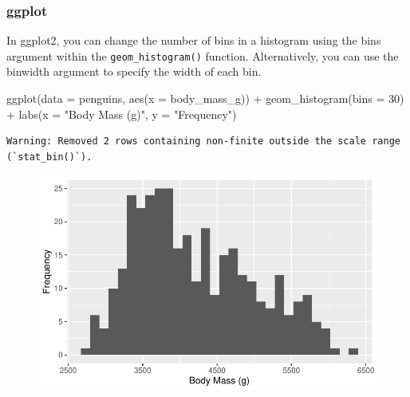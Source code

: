 \documentclass[
  letterpaper,
  DIV=11,
  numbers=noendperiod]{scrreprt}
\newenvironment{Shaded}{\begin{snugshade}}{\end{snugshade}}
\newcommand{\AttributeTok}[1]{\textcolor[rgb]{0.40,0.45,0.13}{#1}}
\newcommand{\DecValTok}[1]{\textcolor[rgb]{0.68,0.00,0.00}{#1}}
\newcommand{\FunctionTok}[1]{\textcolor[rgb]{0.28,0.35,0.67}{#1}}
\newcommand{\NormalTok}[1]{\textcolor[rgb]{0.00,0.23,0.31}{#1}}
\newcommand{\SpecialCharTok}[1]{\textcolor[rgb]{0.37,0.37,0.37}{#1}}
\newcommand{\StringTok}[1]{\textcolor[rgb]{0.13,0.47,0.30}{#1}}
\begin{document}
\begin{tcolorbox}[enhanced jigsaw, left=2mm, colframe=quarto-callout-tip-color-frame, leftrule=.75mm, opacitybacktitle=0.6, toptitle=1mm, title=\textcolor{quarto-callout-tip-color}{\faLightbulb}\hspace{0.5em}{Tip}, opacityback=0, coltitle=black, colbacktitle=quarto-callout-tip-color!10!white, breakable, colback=white, titlerule=0mm, bottomrule=.15mm, arc=.35mm, bottomtitle=1mm, rightrule=.15mm, toprule=.15mm]

\hypertarget{ggplot-8}{%
\subsubsection{ggplot}\label{ggplot-8}}

In ggplot2, you can change the number of bins in a histogram using the
bins argument within the \texttt{geom\_histogram()} function.
Alternatively, you can use the binwidth argument to specify the width of
each bin.

\begin{Shaded}
\begin{Highlighting}[]
\FunctionTok{ggplot}\NormalTok{(}\AttributeTok{data =}\NormalTok{ penguins, }\FunctionTok{aes}\NormalTok{(}\AttributeTok{x =}\NormalTok{ body\_mass\_g)) }\SpecialCharTok{+}
  \FunctionTok{geom\_histogram}\NormalTok{(}\AttributeTok{bins =} \DecValTok{30}\NormalTok{) }\SpecialCharTok{+}
  \FunctionTok{labs}\NormalTok{(}\AttributeTok{x =} \StringTok{"Body Mass (g)"}\NormalTok{, }\AttributeTok{y =} \StringTok{"Frequency"}\NormalTok{)}
\end{Highlighting}
\end{Shaded}

\begin{verbatim}
Warning: Removed 2 rows containing non-finite outside the scale range
(`stat_bin()`).
\end{verbatim}

\begin{figure}[H]

{\centering \includegraphics{scripts/02_dataViz/class4_files/figure-pdf/widths2-1.pdf}

}
\end{figure}
\end{tcolorbox}
\end{document}
